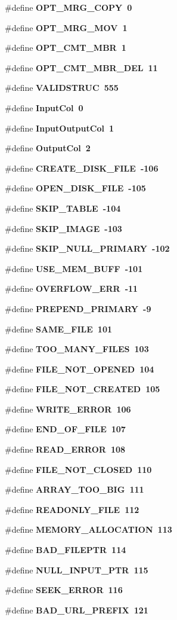 \begin{CompactItemize}
\item 
\#define \bf{OPT\_\-MRG\_\-COPY}~0
\item 
\#define \bf{OPT\_\-MRG\_\-MOV}~1
\item 
\#define \bf{OPT\_\-CMT\_\-MBR}~1
\item 
\#define \bf{OPT\_\-CMT\_\-MBR\_\-DEL}~11
\item 
\#define \bf{VALIDSTRUC}~555
\item 
\#define \bf{Input\-Col}~0
\item 
\#define \bf{Input\-Output\-Col}~1
\item 
\#define \bf{Output\-Col}~2
\item 
\#define \bf{CREATE\_\-DISK\_\-FILE}~-106
\item 
\#define \bf{OPEN\_\-DISK\_\-FILE}~-105
\item 
\#define \bf{SKIP\_\-TABLE}~-104
\item 
\#define \bf{SKIP\_\-IMAGE}~-103
\item 
\#define \bf{SKIP\_\-NULL\_\-PRIMARY}~-102
\item 
\#define \bf{USE\_\-MEM\_\-BUFF}~-101
\item 
\#define \bf{OVERFLOW\_\-ERR}~-11
\item 
\#define \bf{PREPEND\_\-PRIMARY}~-9
\item 
\#define \bf{SAME\_\-FILE}~101
\item 
\#define \bf{TOO\_\-MANY\_\-FILES}~103
\item 
\#define \bf{FILE\_\-NOT\_\-OPENED}~104
\item 
\#define \bf{FILE\_\-NOT\_\-CREATED}~105
\item 
\#define \bf{WRITE\_\-ERROR}~106
\item 
\#define \bf{END\_\-OF\_\-FILE}~107
\item 
\#define \bf{READ\_\-ERROR}~108
\item 
\#define \bf{FILE\_\-NOT\_\-CLOSED}~110
\item 
\#define \bf{ARRAY\_\-TOO\_\-BIG}~111
\item 
\#define \bf{READONLY\_\-FILE}~112
\item 
\#define \bf{MEMORY\_\-ALLOCATION}~113
\item 
\#define \bf{BAD\_\-FILEPTR}~114
\item 
\#define \bf{NULL\_\-INPUT\_\-PTR}~115
\item 
\#define \bf{SEEK\_\-ERROR}~116
\item 
\#define \bf{BAD\_\-URL\_\-PREFIX}~121
\item 

\end{CompactItemize}
